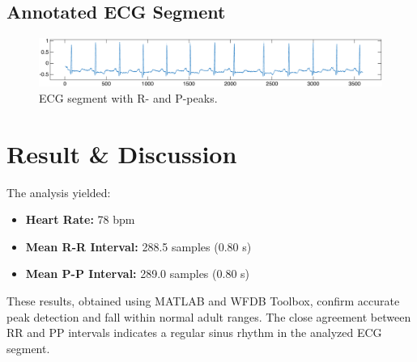 \documentclass[a4paper,11pt]{article}
\begin{document}
\subsection*{Annotated ECG Segment}
\begin{figure}[H]
    \centering
    \includegraphics[width=\textwidth]{ecg.png}
    \caption{ECG segment with R- and P-peaks.}
\end{figure}

\vspace{-.8em}

\section*{Result \& Discussion}
The analysis yielded:
\begin{itemize}
    \item \textbf{Heart Rate:} 78 bpm
    \item \textbf{Mean R-R Interval:} 288.5 samples ($0.80$ s)
    \item \textbf{Mean P-P Interval:} 289.0 samples ($0.80$ s)
\end{itemize}
These results, obtained using MATLAB and WFDB Toolbox, confirm accurate peak detection and fall within normal adult ranges.
The close agreement between RR and PP intervals indicates a regular sinus rhythm in the analyzed ECG segment.


\renewcommand{\bibname}{References}

\end{document}
